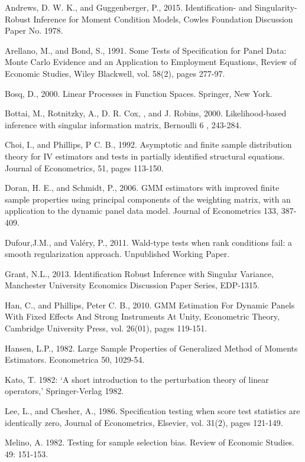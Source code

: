\documentclass[11pt, fleqn]{article}
\begin{document}
Andrews, D. W. K.,  and Guggenberger, P., 2015. Identification- and Singularity-Robust Inference for Moment Condition Models, Cowles Foundation Discussion Paper No. 1978.

Arellano, M., and Bond, S., 1991. Some Tests of Specification for Panel Data: Monte Carlo Evidence and an Application to Employment Equations, Review of Economic Studies, Wiley Blackwell, vol. 58(2), pages 277-97.


 Bosq, D., 2000. Linear Processes in Function Spaces. Springer, New York.

 Bottai, M., Rotnitzky, A., D. R. Cox, , and J. Robins, 2000. Likelihood-based inference with
singular information matrix, Bernoulli 6 , 243-284.

Choi, I., and  Phillips, P C. B., 1992. Asymptotic and finite sample distribution theory for IV estimators and tests in partially identified structural equations. Journal of Econometrics,  51, pages 113-150.

 Doran, H. E., and Schmidt, P., 2006. GMM estimators with improved finite sample properties using principal components of the weighting matrix, with an application to the dynamic panel data model. Journal of Econometrics 133, 387-409.


 Dufour,J.M., and Val\'{e}ry, P., 2011. Wald-type tests when rank conditions fail: a smooth regularization approach. Unpublished Working Paper.


 Grant, N.L., 2013. Identification Robust Inference with Singular Variance, Manchester University Economics Discussion Paper Series, EDP-1315.



Han, C., and Phillips, Peter C. B., 2010. GMM Estimation For Dynamic Panels With Fixed Effects And Strong Instruments At Unity, Econometric Theory, Cambridge University Press, vol. 26(01), pages 119-151.

Hansen, L.P., 1982. Large Sample Properties of Generalized Method of Moments Estimators. Econometrica 50,  1029-54.

Kato, T. 1982: `A short introduction to the perturbation theory of linear operators,' Springer-Verlag 1982.

 Lee, L., and Chesher, A., 1986. Specification testing when score test statistics are identically zero, Journal of Econometrics, Elsevier, vol. 31(2), pages 121-149.

Melino, A. 1982. Testing for sample selection bias. Review of Economic
Studies. 49: 151-153.
\end{document}
